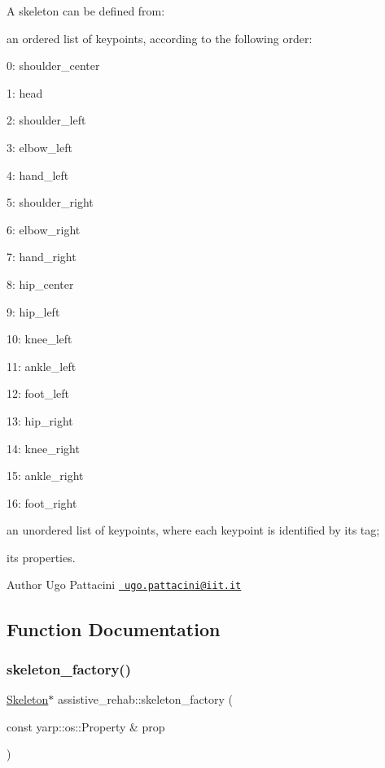 A skeleton can be defined from\+:
\begin{DoxyItemize}
\item an ordered list of keypoints, according to the following order\+:
\begin{DoxyItemize}
\item 0\+: shoulder\+\_\+center
\item 1\+: head
\item 2\+: shoulder\+\_\+left
\item 3\+: elbow\+\_\+left
\item 4\+: hand\+\_\+left
\item 5\+: shoulder\+\_\+right
\item 6\+: elbow\+\_\+right
\item 7\+: hand\+\_\+right
\item 8\+: hip\+\_\+center
\item 9\+: hip\+\_\+left
\item 10\+: knee\+\_\+left
\item 11\+: ankle\+\_\+left
\item 12\+: foot\+\_\+left
\item 13\+: hip\+\_\+right
\item 14\+: knee\+\_\+right
\item 15\+: ankle\+\_\+right
\item 16\+: foot\+\_\+right
\end{DoxyItemize}
\item an unordered list of keypoints, where each keypoint is identified by its tag;
\item its properties.
\end{DoxyItemize}

\begin{DoxyAuthor}{Author}
Ugo Pattacini \href{mailto:ugo.pattacini@iit.it}{\texttt{ ugo.\+pattacini@iit.\+it}} 
\end{DoxyAuthor}


\subsection{Function Documentation}
\mbox{\label{group__skeleton_gafe9fe27bb8b50a0843b93dfbb5c571b1}} 
\subsubsection{\texorpdfstring{skeleton\_factory()}{skeleton\_factory()}}
{\footnotesize\ttfamily \mbox{\hyperlink{classassistive__rehab_1_1Skeleton}{Skeleton}}$\ast$ assistive\+\_\+rehab\+::skeleton\+\_\+factory (\begin{DoxyParamCaption}\item[{const yarp\+::os\+::\+Property \&}]{prop }\end{DoxyParamCaption})}



